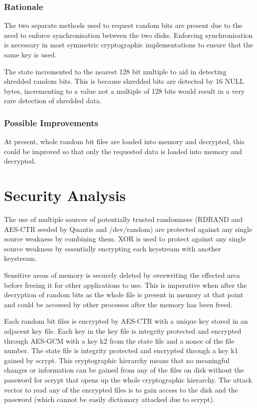 \documentclass{paper}
\begin{document}
				\subsubsection{Rationale}
					The two separate methods used to request random bits are present due to the need to enforce synchronisation between the two disks. Enforcing synchronisation is necessary in most symmetric cryptographic implementations to ensure that the same key is used.
					
					The state incremented to the nearest 128 bit multiple to aid in detecting shredded random bits. This is because shredded bits are detected by 16 NULL bytes, incrementing to a value not a multiple of 128 bits would result in a very rare detection of shredded data.
				\subsubsection{Possible Improvements}
					At present, whole random bit files are loaded into memory and decrypted, this could be improved so that only the requested data is loaded into memory and decrypted.\\			
				
		
		\section{Security Analysis}
			The use of multiple sources of potentially trusted randomness (RDRAND and AES-CTR seeded by Quantis and /dev/random) are protected against any single source weakness by combining them. XOR is used to protect against any single source weakness by essentially encrypting each keystream with another keystream.
			
			Sensitive areas of memory is securely deleted by overwriting the effected area before freeing it for other applications to use. This is imperative when after the decryption of random bits as the whole file is present in memory at that point and could be accessed by other processes after the memory has been freed. 
			
			Each random bit files is encrypted by AES-CTR with a unique key stored in an adjacent key file. Each key in the key file is integrity protected and encrypted through AES-GCM with a key k2 from the state file and a nonce of the file number. The state file is integrity protected and encrypted through a key k1 gained by scrypt.	This cryptographic hierarchy means that no meaningful changes or information can be gained from any of the files on disk without the password for scrypt that opens up the whole cryptographic hierarchy. The attack vector to read any of the encrypted files is to gain access to the disk and the password (which cannot be easily dictionary attacked due to scrypt).
			
\end{document}

